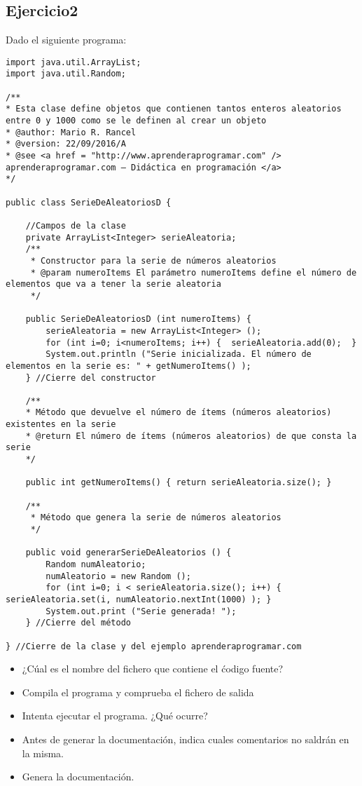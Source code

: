 \documentclass[4paper]{article}
\begin{document}
\subsection{Ejercicio2}
Dado el siguiente programa:
\begin{verbatim}
import java.util.ArrayList;
import java.util.Random;

/**
* Esta clase define objetos que contienen tantos enteros aleatorios entre 0 y 1000 como se le definen al crear un objeto
* @author: Mario R. Rancel
* @version: 22/09/2016/A
* @see <a href = "http://www.aprenderaprogramar.com" /> aprenderaprogramar.com – Didáctica en programación </a>
*/

public class SerieDeAleatoriosD {

    //Campos de la clase
    private ArrayList<Integer> serieAleatoria;
    /**
     * Constructor para la serie de números aleatorios
     * @param numeroItems El parámetro numeroItems define el número de elementos que va a tener la serie aleatoria
     */

    public SerieDeAleatoriosD (int numeroItems) {
        serieAleatoria = new ArrayList<Integer> ();
        for (int i=0; i<numeroItems; i++) {  serieAleatoria.add(0);  }
        System.out.println ("Serie inicializada. El número de elementos en la serie es: " + getNumeroItems() );
    } //Cierre del constructor

    /**
    * Método que devuelve el número de ítems (números aleatorios) existentes en la serie
    * @return El número de ítems (números aleatorios) de que consta la serie
    */

    public int getNumeroItems() { return serieAleatoria.size(); }

    /**
     * Método que genera la serie de números aleatorios
     */

    public void generarSerieDeAleatorios () {
        Random numAleatorio;
        numAleatorio = new Random ();
        for (int i=0; i < serieAleatoria.size(); i++) { serieAleatoria.set(i, numAleatorio.nextInt(1000) ); }
        System.out.print ("Serie generada! ");
    } //Cierre del método

} //Cierre de la clase y del ejemplo aprenderaprogramar.com
\end{verbatim}
\begin{itemize}
\item ¿Cúal es el nombre del fichero que contiene el ćodigo fuente?
\item Compila el programa y comprueba el fichero de salida
\item Intenta ejecutar el programa. ¿Qué ocurre?
\item Antes de generar la documentación, indica cuales comentarios no saldrán en la misma.
\item Genera la documentación.
\end{itemize}
\end{document}
